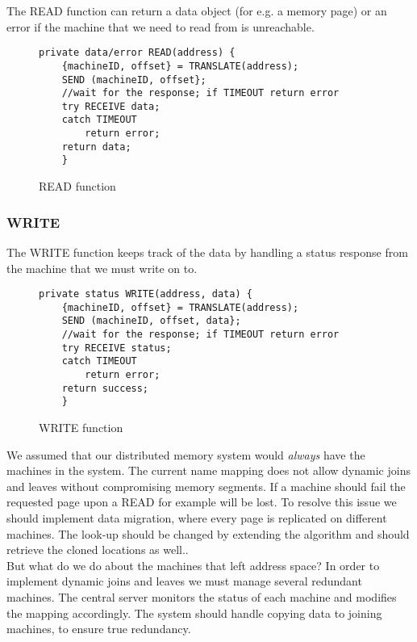 \documentclass{article}      %
\begin{document}
The READ function can return a data object (for e.g. a memory page) or an error if the machine that we need to read from is unreachable.\\

\begin{figure}[htbp]
\begin{center}
\begin{lstlisting}
private data/error READ(address) {
	{machineID, offset} = TRANSLATE(address);
	SEND (machineID, offset};
	//wait for the response; if TIMEOUT return error
	try RECEIVE data;   
	catch TIMEOUT
		return error;
	return data;
	}
\end{lstlisting}
\caption{READ function}
\label{READ function}
\end{center}
\end{figure}

\subsubsection*{WRITE}

The WRITE function keeps track of the data by handling a status response from the machine that we must write on to.\\

\begin{figure}[htbp]
\begin{center}
\begin{lstlisting}
private status WRITE(address, data) {
	{machineID, offset} = TRANSLATE(address);
	SEND (machineID, offset, data};
	//wait for the response; if TIMEOUT return error
	try RECEIVE status;   
	catch TIMEOUT
		return error;
	return success;
	}
\end{lstlisting}
\caption{WRITE function}
\label{WRITE function}
\end{center}
\end{figure}

We assumed that our distributed memory system would \emph{always} have the machines in the system. The current name mapping does not allow dynamic joins and leaves without compromising memory segments. If a machine should fail the requested page upon a READ for example will be lost. To resolve this issue we should implement data migration, where every page is replicated on different machines. The look-up should be changed by extending the algorithm and should retrieve the cloned locations as well..\\ 

But what do we do about the machines that left address space? In order to implement dynamic joins and leaves we must manage several redundant machines. The central server monitors the status of each machine and modifies the mapping accordingly. The system should handle copying data to joining
machines, to ensure true redundancy. \\ 
\end{document}
